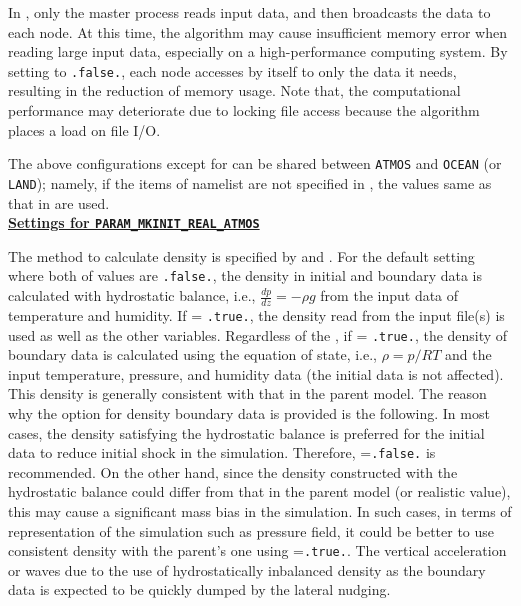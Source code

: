 In \scalerm, only the master process reads input data, and then broadcasts the data to each node.
At this time, the algorithm may cause insufficient memory error when reading large input data, especially on a high-performance computing system.
By setting  to \verb|.false.|, each node accesses by itself to only the data it needs, resulting in the reduction of memory usage.
Note that, the computational performance may deteriorate due to locking file access because the algorithm places a load on file I/O.


The above configurations except for  can be shared between \verb|ATMOS| and \verb|OCEAN| (or \verb|LAND|); 
namely, if the items of namelist are not specified in ,
the values same as that in  are used.
\\

\noindent\textbf{\underline{Settings for \texttt{PARAM\_MKINIT\_REAL\_ATMOS}}}

The method to calculate density is specified by  and . 
For the default setting where both of values are \verb|.false.|, the density in initial and boundary data is calculated with hydrostatic balance, i.e., $\frac{dp}{dz}=-\rho g$ from the input data of temperature and humidity.
If  = \verb|.true.|, the density read from the input file(s) is used as well as the other variables. 
Regardless of the , if  = \verb|.true.|,
the density of boundary data is calculated using the equation of state, i.e., $\rho = p/RT$ and the input temperature, pressure, and humidity data (the initial data is not affected).
This density is generally consistent with that in the parent model. 
The reason why the option for density boundary data is provided is the following.
In most cases, the density satisfying the hydrostatic balance is preferred for the initial data to reduce initial shock in the simulation.
Therefore, =\verb|.false.| is recommended. 
On the other hand, since the density constructed with the hydrostatic balance could differ from that in the parent model (or realistic value), this may cause a significant mass bias in the simulation.
In such cases, in terms of representation of the simulation such as pressure field, it could be better to use consistent density with the parent's one using =\verb|.true.|.
The vertical acceleration or waves due to the use of hydrostatically inbalanced density as the boundary data is expected to be quickly dumped by the lateral nudging.


